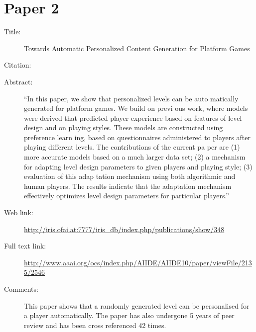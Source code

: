 \documentclass{scrartcl}
\begin{document}
\section*{Paper 2}
\begin{description}
\item[Title:] Towards Automatic Personalized Content Generation for Platform Games
\item[Citation:] \cite{Shaker}
\item[Abstract:] ``In this paper, we show that personalized levels can be auto
matically generated for platform games.  We build on previ
ous work, where models were derived that predicted player
experience based on features of level design and on playing
styles.  These models are constructed using preference learn
ing,  based  on  questionnaires  administered  to  players  after
playing different levels.  The contributions of the current pa
per are (1) more accurate models based on a much larger data
set; (2) a mechanism for adapting level design parameters to
given players and playing style; (3) evaluation of this adap
tation mechanism using both algorithmic and human players.
The results indicate that the adaptation mechanism effectively
optimizes level design parameters for particular players.''
\item[Web link:] \url{http://iris.ofai.at:7777/iris_db/index.php/publications/show/348}
\item[Full text link:] \url{http://www.aaai.org/ocs/index.php/AIIDE/AIIDE10/paper/viewFile/2135/2546}
\item[Comments:] This paper shows that a randomly generated level can be personalised for a player automatically. The paper has also undergone 5 years of peer review and has been cross referenced 42 times.
\end{description}
\end{document}
